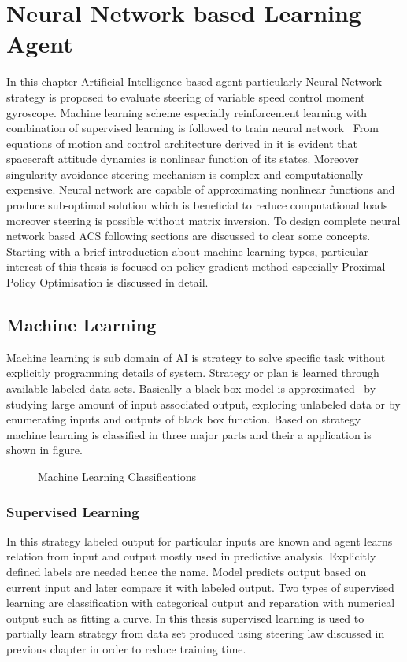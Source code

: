 \chapter{Neural Network based Learning Agent}
\label{chap:6}
In this chapter Artificial Intelligence based agent particularly Neural Network strategy is proposed to evaluate steering of variable speed control moment gyroscope. Machine learning scheme especially reinforcement learning with combination of supervised learning is followed to train neural network \ From equations of motion and control architecture derived in it is evident that spacecraft attitude dynamics is nonlinear function of its states. Moreover singularity avoidance steering mechanism is complex and computationally expensive. Neural network are capable of approximating nonlinear functions and produce sub-optimal solution which is beneficial to reduce computational loads moreover steering is possible without matrix inversion. To design complete neural network based ACS following sections are discussed to clear some concepts. Starting with a brief introduction about machine learning types, particular interest of this thesis is focused on policy gradient method especially Proximal Policy Optimisation is discussed in detail.

\section{Machine Learning}
Machine learning is sub domain of AI is strategy to solve specific task without explicitly programming details of system. Strategy or plan is learned through available labeled data sets. Basically a black box model is approximated \ by studying large amount of input associated output, exploring unlabeled data or by enumerating inputs and outputs of black box function. Based on strategy machine learning is classified in three major parts and their a
application is shown in figure.
\begin{figure}
    \centering
    \scalebox{.5}{}
    \caption{Machine Learning Classifications}
    \label{fig:ML_Mindmap}
\end{figure}
\subsection{Supervised Learning}
In this strategy labeled output for particular inputs are known and agent learns relation from input and output mostly used in predictive analysis. Explicitly defined labels are needed hence the name. Model predicts output based on current input and later compare it with labeled output. Two types of supervised learning are classification with categorical output and reparation with numerical output such as fitting a curve. In this thesis supervised learning is used to partially learn strategy from data set produced using steering law discussed in previous chapter in order to reduce training time.

